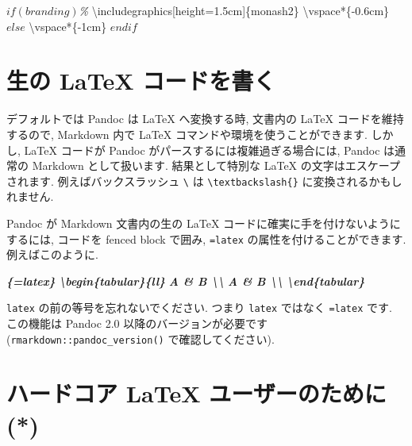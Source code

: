 \documentclass[
  11pt,
  lualatex,
  ja=standard]{bxjsreport}
\newenvironment{Shaded}{\begin{snugshade}}{\end{snugshade}}
\newcommand{\BuiltInTok}[1]{#1}
\newcommand{\CommentTok}[1]{\textcolor[rgb]{0.56,0.35,0.01}{\textit{#1}}}
\newcommand{\ExtensionTok}[1]{#1}
\newcommand{\FunctionTok}[1]{\textcolor[rgb]{0.00,0.00,0.00}{#1}}
\newcommand{\InformationTok}[1]{\textcolor[rgb]{0.56,0.35,0.01}{\textbf{\textit{#1}}}}
\newcommand{\NormalTok}[1]{#1}
\newcommand{\SpecialStringTok}[1]{\textcolor[rgb]{0.31,0.60,0.02}{#1}}
\begin{document}
\begin{Shaded}
\begin{Highlighting}[]
\SpecialStringTok{$if(branding)$}\CommentTok{\%}
\BuiltInTok{\textbackslash{}includegraphics}\NormalTok{[height=1.5cm]\{}\ExtensionTok{monash2}\NormalTok{\}}
\FunctionTok{\textbackslash{}vspace*}\NormalTok{\{{-}0.6cm\}}
\SpecialStringTok{$else$}
\FunctionTok{\textbackslash{}vspace*}\NormalTok{\{{-}1cm\}}
\SpecialStringTok{$endif$}
\end{Highlighting}
\end{Shaded}

\hypertarget{raw-latex}{%
\section{生の LaTeX コードを書く}\label{raw-latex}}

デフォルトでは Pandoc は LaTeX へ変換する時, 文書内の LaTeX コードを維持するので, Markdown 内で LaTeX コマンドや環境を使うことができます. しかし, LaTeX コードが Pandoc がパースするには複雑過ぎる場合には, Pandoc は通常の Markdown として扱います. 結果として特別な LaTeX の文字はエスケープされます. 例えばバックスラッシュ \texttt{\textbackslash{}} は \texttt{\textbackslash{}textbackslash\{\}} に変換されるかもしれません.

Pandoc が Markdown 文書内の生の LaTeX コードに確実に手を付けないようにするには, コードを fenced block で囲み, \texttt{=latex} の属性を付けることができます. 例えばこのように.

\begin{Shaded}
\begin{Highlighting}[]
\InformationTok{\textasciigrave{}\textasciigrave{}\textasciigrave{}\{=latex\}}
\InformationTok{\textbackslash{}begin\{tabular\}\{ll\}}
\InformationTok{A \& B \textbackslash{}\textbackslash{}}
\InformationTok{A \& B \textbackslash{}\textbackslash{}}
\InformationTok{\textbackslash{}end\{tabular\}}
\InformationTok{\textasciigrave{}\textasciigrave{}\textasciigrave{}}
\end{Highlighting}
\end{Shaded}

\texttt{latex} の前の等号を忘れないでください. つまり \texttt{latex} ではなく \texttt{=latex} です. この機能は Pandoc 2.0 以降のバージョンが必要です (\texttt{rmarkdown::pandoc\_version()} で確認してください).

\hypertarget{latex-hardcore}{%
\section{ハードコア LaTeX ユーザーのために (*)}\label{latex-hardcore}}
\end{document}
